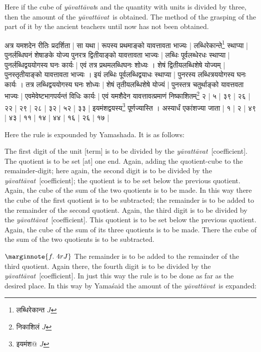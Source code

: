 \documentclass[12pt]{book}
\def\yavattavat{\textit{y\=avat\-t\=avat}}
\begin{document}
Here if the cube of \yavattavat s and the quantity with units is divided by three, then the amount of the \yavattavat\ is obtained.    
The method of the grasping of the part of it 
by the ancient teachers until now has not been obtained.

\newpage

{\s अत्र यमशदेन रीतिः प्रदर्शिता |
सा यथा | रूपस्य प्रथमाङ्को यावत्तावता भाज्यः | लब्धिरेकान्ते\footnote{{\s लब्धिरेकान्त} $J$} स्थाप्या | पुनर्लब्धिघनं शेषाङके योज्य
पुनरत्र द्वितीयाङ्को यावत्तावता भाज्यः | लब्धिः पूर्वलब्धेरधः स्थाप्या | पुनर्लब्धिद्वययोगस्य घनः
कार्यः | एवं तत्र प्रथमलब्धिघनः शोध्यः । शेषं द्वितीयलब्धिशेषे योज्यम् | पुनस्तृतीयाङ्को
यावत्तावता भाज्यः । इयं लब्धिः पूर्वलब्धिद्वयाधः स्थाप्या | पुनरस्य लब्धित्रययोगस्य घनः कार्यः ।
तत्र लब्धिद्वययोगस्य घनः शोध्यः | %
शेषं तृतीयलब्धिशेषे योज्यं | पुनस्तत्र चतुर्थाङ्को यावत्तवता भाज्यः | एवमेवेष्टभागपर्यन्तं विधिः कार्यः |
एवं यमशैदेन यावत्तावत्प्रमाणं निष्काशितम्\footnote{{\s निकाशिलं} $J$} २ | ५ | ३९ | २६ | २२ | २९ | २८ | ३२ | ५२ | ३३ | इयमंशद्वयस्य\footnote{{\s इयमंश@} $J$} पूर्णज्यास्ति । अस्यार्धं एकांशज्या जाता | १ | २ | ४९ | ४३ | ११ | १४ | ४४ | १६ | २६ | १७ |} 

\newpage

Here the rule is expounded by Yamashada. 
It is as follows:

The first digit of the unit [term] is to be divided by the \yavattavat\ [coefficient]. The quotient is to be set
[at] one end. Again, adding the quotient-cube to the remainder-digit;
here again, the second digit is to be divided by the \yavattavat\ [coefficient]; the quotient is to be set
below the previous quotient. Again, the cube of the sum of the two quotients
is to be made.  In this way there the cube of the first quotient is to be subtracted;
the remainder is to be added to the remainder of the second quotient. Again, the third digit is to be
divided by the \yavattavat\ [coefficient]. This quotient is to be set below the previous quotient. Again,
the cube of the sum of its three quotients is to be made. There the cube of
the sum of the two quotients is to be subtracted. 

$\marginnote{f.~4r J}$
The remainder is to be added to the remainder of the third quotient. Again there, the 
fourth digit is to be divided by the \yavattavat\ [coefficient]. In just this way the rule is to be done as far
as the desired place. In this way by  Yama\'said the amount of the \yavattavat\ is 
expanded:
\end{document}
